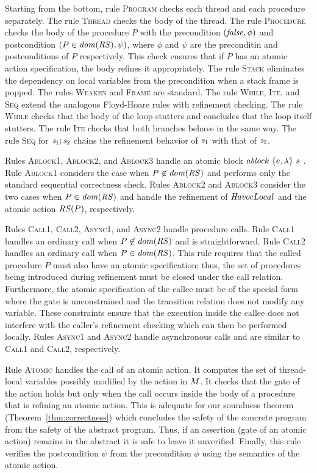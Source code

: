 Starting from the bottom, rule \textsc{Program} checks each thread and each procedure separately.
The rule \textsc{Thread} checks the body of the thread.
The rule \textsc{Procedure} checks the body of the procedure $P$ with
the precondition $(\mathit{false},\phi)$ and postcondition $(P \in \mathit{dom}(\mathit{RS}),\psi)$,
where $\phi$ and $\psi$ are the preconditin and postconditions of $P$ respectively.
This check ensures that if $P$ has an atomic action specification, the body refines it appropriately.
The rule \textsc{Stack} eliminates the dependency on local variables from the precondition when a stack frame is popped.
The rules \textsc{Weaken} and \textsc{Frame} are standard.
The rule \textsc{While}, \textsc{Ite}, and \textsc{Seq} extend the analogous Floyd-Hoare rules with refinement checking.
The rule \textsc{While} checks that the body of the loop stutters and concludes that the loop itself stutters.
The rule \textsc{Ite} checks that both branches behave in the same way.
The rule \textsc{Seq} for $\mathit{s}_1;\mathit{s}_2$ chains the refinement behavior of $\mathit{s}_1$ with that of $\mathit{s}_2$.

Rules \textsc{Ablock1}, \textsc{Ablock2}, and \textsc{Ablock3} handle an atomic block $\mathit{ablock}\ {\{e,\lambda\}}\ {s}\ $.
Rule \textsc{Ablock1} considers the case when $P \not \in \mathit{dom}(\mathit{RS})$ and performs only the 
standard sequential correctness check.
Rules \textsc{Ablock2} and \textsc{Ablock3} consider the two cases when $P \in \mathit{dom}(\mathit{RS})$ and handle
the refinement of $\mathit{Havoc}{Local}$ and the atomic action $\mathit{RS}(P)$, respectively.

Rules \textsc{Call1}, \textsc{Call2}, \textsc{Async1}, and \textsc{Async2} handle procedure calls.
Rule \textsc{Call1} handles an ordinary call when $P \not \in \mathit{dom}(\mathit{RS})$ and is straightforward.
Rule \textsc{Call2} handles an ordinary call when $P \in \mathit{dom}(\mathit{RS})$.
This rule requires that the called procedure $P$ must also have an atomic specification;
thus, the set of procedures being introduced during refinement must be closed under the call relation.
Furthermore, the atomic specification of the callee must be of the special form
where the gate is unconstrained and the transition relation does not modify any variable.
These constraints ensure that the execution inside the callee does not interfere with the caller's refinement checking 
which can then be performed locally.
Rules \textsc{Async1} and \textsc{Async2} handle asynchronous calls and are similar to \textsc{Call1} and \textsc{Call2}, respectively.

Rule \textsc{Atomic} handles the call of an atomic action.
It computes the set of thread-local variables possibly modified by the action in $M$.
It checks that the gate of the action holds but only when the call occurs inside the body of a procedure 
that is refining an atomic action.
This is adequate for our soundness theorem (Theorem~\ref{thm:correctness}) which concludes the safety of the concrete 
program from the safety of the abstract program.
Thus, if an assertion (gate of an atomic action) remains in the abstract it is safe to leave it unverified.
Finally, this rule verifies the postcondition $\psi$ from the precondition $\phi$ using the semantics of the atomic action.

